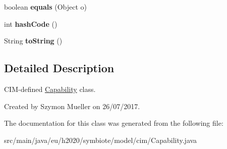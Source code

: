 \begin{DoxyCompactItemize}
boolean {\bfseries equals} (Object o)
\item 
\mbox{\label{classeu_1_1h2020_1_1symbiote_1_1model_1_1cim_1_1Capability_a7e6160cfb4dce98b0cfc19dc8b72f4f9}} 
int {\bfseries hash\+Code} ()
\item 
\mbox{\label{classeu_1_1h2020_1_1symbiote_1_1model_1_1cim_1_1Capability_a749aadf564971959544dd952fe0a0da1}} 
String {\bfseries to\+String} ()
\end{DoxyCompactItemize}


\subsection{Detailed Description}
C\+I\+M-\/defined \hyperlink{classeu_1_1h2020_1_1symbiote_1_1model_1_1cim_1_1Capability}{Capability} class.

Created by Szymon Mueller on 26/07/2017. 

The documentation for this class was generated from the following file\+:\begin{DoxyCompactItemize}
\item 
src/main/java/eu/h2020/symbiote/model/cim/Capability.\+java\end{DoxyCompactItemize}
